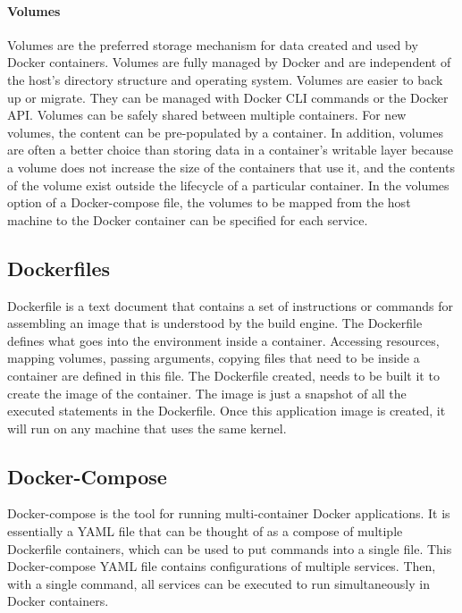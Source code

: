 		\paragraph{Volumes}
		Volumes are the preferred storage mechanism for data created and used by Docker containers. Volumes are fully managed by Docker and are independent of the host's directory structure and operating system. Volumes are easier to back up or migrate. They can be managed with Docker CLI commands or the Docker API. Volumes can be safely shared between multiple containers. For new volumes, the content can be pre-populated by a container. In addition, volumes are often a better choice than storing data in a container's writable layer because a volume does not increase the size of the containers that use it, and the contents of the volume exist outside the lifecycle of a particular container. In the volumes option of a Docker-compose file, the volumes to be mapped from the host machine to the Docker container can be specified for each service.\cite{dockerStorage}
			
		\subsection{Dockerfiles}
		\label{Grundlagen:Docker:Dockerfiles}	
		Dockerfile is a text document that contains a set of instructions or commands for assembling an image that is understood by the build engine. The Dockerfile defines what goes into the environment inside a container. Accessing resources, mapping volumes, passing arguments, copying files that need to be inside a container are defined in this file. The Dockerfile created, needs to be built it to create the image of the container. The image is just a snapshot of all the executed statements in the Dockerfile. Once this application image is created, it will run on any machine that uses the same kernel. \cite[P.~56]{Kinnary2018}
		
		\subsection{Docker-Compose}
		\label{Grundlagen:Docker:Docker-Compose}	
		Docker-compose is the tool for running multi-container Docker applications. It is essentially a YAML file that can be thought of as a compose of multiple Dockerfile containers, which can be used to put commands into a single file. This Docker-compose YAML file contains configurations of multiple services. Then, with a single command, all services can be executed to run simultaneously in Docker containers.\cite[P.~77-79]{Kinnary2018}\\

